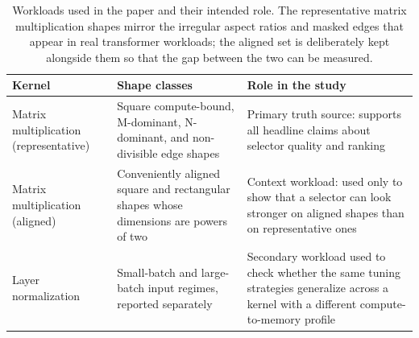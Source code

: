\begin{table}[t]
\centering
\small
\begin{tabular}{p{}p{}p{}}
\toprule
Kernel & Shape classes & Role in the study \\
\midrule
Matrix multiplication (representative) & Square compute-bound, M-dominant, N-dominant, and non-divisible edge shapes & Primary truth source: supports all headline claims about selector quality and ranking \\
Matrix multiplication (aligned) & Conveniently aligned square and rectangular shapes whose dimensions are powers of two & Context workload: used only to show that a selector can look stronger on aligned shapes than on representative ones \\
Layer normalization & Small-batch and large-batch input regimes, reported separately & Secondary workload used to check whether the same tuning strategies generalize across a kernel with a different compute-to-memory profile \\
\bottomrule
\end{tabular}
\caption{Workloads used in the paper and their intended role. The representative matrix multiplication shapes mirror the irregular aspect ratios and masked edges that appear in real transformer workloads; the aligned set is deliberately kept alongside them so that the gap between the two can be measured.}
\label{tab:workloads}
\end{table}
